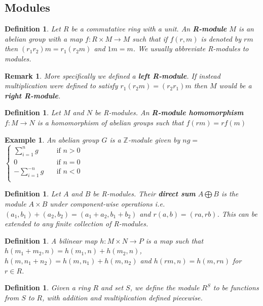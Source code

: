 \documentclass{article}
\newtheorem{definition}[theorem]{Definition}
\newtheorem{example}[theorem]{Example}
\newtheorem{remark}[theorem]{Remark}
\begin{document}
\subsection{Modules}
\begin{definition}
Let $R$ be a commutative ring with a unit. An \textbf{R-module} $M$ is an abelian group with a map $f\colon R\times M\to M$ such that if $f(r,m)$ is denoted by $rm$ then $(r_1r_2)m=r_1(r_2m)$ and $1m=m$. We usually abbreviate R-modules to modules.
\end{definition}
\begin{remark}
More specifically we defined a \textbf{left R-module}. If instead multiplication were defined to satisfy $r_1(r_2m)=(r_2r_1)m$ then $M$ would be a \textbf{right R-module}.
\end{remark}

\begin{definition}
Let $M$ and $N$ be R-modules. An \textbf{R-module homomorphism} $f\colon M\to N$ is a homomorphism of abelian groups such that $f(rm)=rf(m)$ 
\end{definition}

\begin{example}
An abelian group $G$ is a $\mathbb{Z}$-module given by $ng=$$\begin{cases}
       \sum_{i=1}^ng &\quad\text{if }n>0 \\
       0 &\quad\text{if }n=0 \\
       -\sum_{i=1}^{-n}g &\quad\text{if }n<0 \\
     \end{cases}$\\
\end{example}

\begin{definition}
Let $A$ and $B$ be R-modules. Their \textbf{direct sum} $A\bigoplus B$ is the module $A\times B$ under component-wise operations i.e. $(a_1,b_1)+(a_2,b_2)=(a_1+a_2,b_1+b_2)$ and $r(a,b)=(ra,rb)$. This can be extended to any finite collection of R-modules.
\end{definition}

\begin{definition}
A bilinear map $h\colon M\times N\to P$ is a map such that $h(m_1+m_2,n)=h(m_1,n)+h(m_2,n)$, $h(m,n_1+n_2)=h(m,n_1)+h(m,n_2)$ and $h(rm,n)=h(m,rn)$ for $r\in R$.
\end{definition}

\begin{definition}
Given a ring $R$ and set $S$, we define the module $R^S$ to be functions from $S$ to $R$, with addition and multiplication defined piecewise.
\end{definition}
\end{document}
